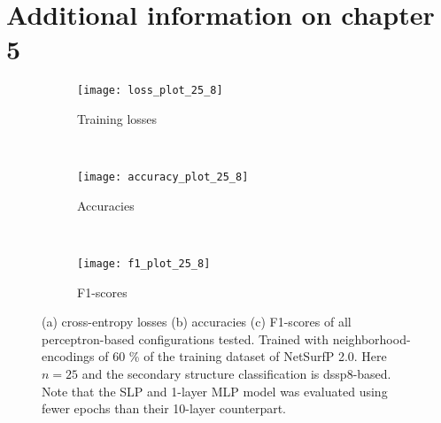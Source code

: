 \chapter{Additional information on chapter 5}\label{app:chp5}
\begin{figure}[H]
    \centering
    \begin{minipage}[b]{.6\textwidth}
        \begin{subfigure}[b]{\textwidth}
        \texttt{[image: loss\_plot\_25\_8]}
        \caption{Training losses}
        \label{fig:loss}
    \end{subfigure}
    \end{minipage}
    \\
    \centering
    \begin{minipage}[b]{.6\textwidth}
    \begin{subfigure}[b]{\textwidth}
        \texttt{[image: accuracy\_plot\_25\_8]}
        \caption{Accuracies}
        \label{fig:accuracy}
    \end{subfigure}
    \end{minipage}
    \\
    \centering
    \begin{minipage}[b]{.6\textwidth}
    \begin{subfigure}[b]{\textwidth}
        \texttt{[image: f1\_plot\_25\_8]}
        \caption{F1-scores}\label{fig:f1}
    \end{subfigure}
    \end{minipage}
    \caption{(a) cross-entropy losses (b) accuracies (c) F1-scores of all perceptron-based configurations tested. Trained with neighborhood-encodings of 60 \% of the training dataset of NetSurfP 2.0. Here $n=25$ and the secondary structure classification is dssp8-based. Note that the SLP and 1-layer MLP model was evaluated using fewer epochs than their 10-layer counterpart.}\label{fig:she2}
    \end{figure}

